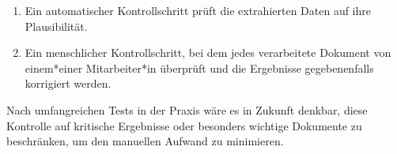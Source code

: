 \begin{enumerate}
    \item Ein automatischer Kontrollschritt prüft die extrahierten Daten auf ihre Plausibilität.
    
    \item Ein menschlicher Kontrollschritt, bei dem jedes verarbeitete Dokument von einem*einer Mitarbeiter*in überprüft und die Ergebnisse gegebenenfalls korrigiert werden.
\end{enumerate}

Nach umfangreichen Tests in der Praxis wäre es in Zukunft denkbar, diese Kontrolle auf kritische Ergebnisse oder besonders wichtige Dokumente zu beschränken, um den manuellen Aufwand zu minimieren.